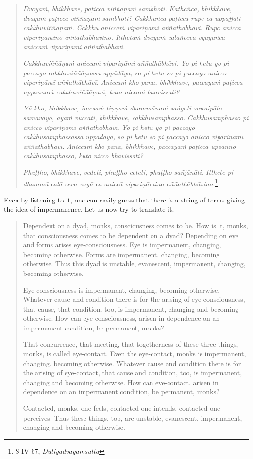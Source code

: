 \begin{quote}
\emph{Dvayaṁ, bhikkhave, paṭicca viññāṇaṁ sambhoti. Kathañca, bhikkhave, dvayaṁ paṭicca viññāṇaṁ sambhoti? Cakkhuñca paṭicca rūpe ca uppajjati cakkhuviññāṇaṁ. Cakkhu aniccaṁ vipariṇāmi aññathābhāvi. Rūpā aniccā vipariṇāmino aññathābhāvino. Itthetaṁ dvayaṁ calañceva vyayañca aniccaṁ vipariṇāmi aññathābhāvi.}

\emph{Cakkhuviññāṇaṁ aniccaṁ vipariṇāmi aññathābhāvi. Yo pi hetu yo pi paccayo cakkhuviññāṇassa uppādāya, so pi hetu so pi paccayo anicco vipariṇāmī aññathābhāvī. Aniccaṁ kho pana, bhikkhave, paccayaṁ paṭicca uppannaṁ cakkhuviññāṇaṁ, kuto niccaṁ bhavissati?}

\emph{Yā kho, bhikkhave, imesaṁ tiṇṇaṁ dhammānaṁ saṅgati sannipāto samavāyo, ayaṁ vuccati, bhikkhave, cakkhusamphasso. Cakkhusamphasso pi anicco vipariṇāmī aññathābhāvī. Yo pi hetu yo pi paccayo cakkhusamphassassa uppādāya, so pi hetu so pi paccayo anicco vipariṇāmī aññathābhāvī. Aniccaṁ kho pana, bhikkhave, paccayaṁ paṭicca uppanno cakkhusamphasso, kuto nicco bhavissati?}

\emph{Phuṭṭho, bhikkhave, vedeti, phuṭṭho ceteti, phuṭṭho sañjānāti. Itthete pi dhammā calā ceva vayā ca aniccā vipariṇāmino aññathābhāvino.}\footnote{S IV 67, \emph{Dutiyadvayamsutta}}
\end{quote}

Even by listening to it, one can easily guess that there is a string of terms giving the idea of impermanence. Let us now try to translate it.

\begin{quote}
Dependent on a dyad, monks, consciousness comes to be. How is it, monks, that consciousness comes to be dependent on a dyad? Depending on eye and forms arises eye-consciousness. Eye is impermanent, changing, becoming otherwise. Forms are impermanent, changing, becoming otherwise. Thus this dyad is unstable, evanescent, impermanent, changing, becoming otherwise.

Eye-consciousness is impermanent, changing, becoming otherwise. Whatever cause and condition there is for the arising of eye-consciousness, that cause, that condition, too, is impermanent, changing and becoming otherwise. How can eye-consciousness, arisen in dependence on an impermanent condition, be permanent, monks?

That concurrence, that meeting, that togetherness of these three things, monks, is called eye-contact. Even the eye-contact, monks is impermanent, changing, becoming otherwise. Whatever cause and condition there is for the arising of eye-contact, that cause and condition, too, is impermanent, changing and becoming otherwise. How can eye-contact, arisen in dependence on an impermanent condition, be permanent, monks?

Contacted, monks, one feels, contacted one intends, contacted one perceives. Thus these things, too, are unstable, evanescent, impermanent, changing and becoming otherwise.
\end{quote}

